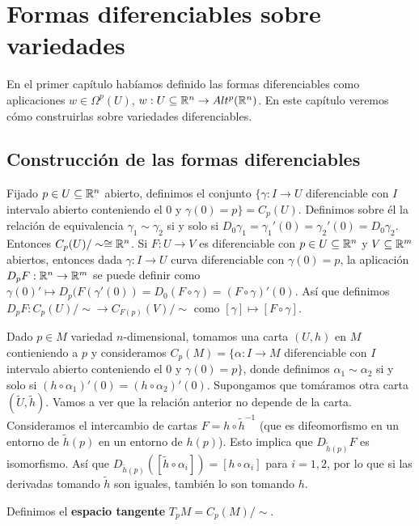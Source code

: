 \documentclass[CV.tex]{subfiles}
\begin{document}

\chapter{Formas diferenciables sobre variedades}

En el primer capítulo habíamos definido las formas diferenciables como aplicaciones $w\in\Omega^p(U)$, $w:U\subseteq\mathbb{R}^n\to Alt^p(\mathbb{R}^n)$. En este capítulo veremos cómo construirlas sobre variedades diferenciables.

\section{Construcción de las formas diferenciables}

Fijado $p\in U\subseteq\mathbb{R}^n$ abierto, definimos el conjunto $\{\gamma:I\to U$ diferenciable con $I$ intervalo abierto conteniendo el 0 y $\gamma(0)=p\}=C_p(U)$. Definimos sobre él la relación de equivalencia $\gamma_1\sim\gamma_2$ si y solo si $D_0\gamma_1=\gamma_1'(0)=\gamma_2'(0)=D_0\gamma_2$. Entonces $C_p(U)/\sim\cong\mathbb{R}^n$. Si $F:U\to V$ es diferenciable con $p\in U\subseteq\mathbb{R}^n$ y $V\subseteq\mathbb{R}^m$ abiertos, entonces dada $\gamma:I\to U$ curva diferenciable con $\gamma(0)=p$, la aplicación $D_pF:\mathbb{R}^n\to \mathbb{R}^m$ se puede definir como $\gamma(0)'\mapsto D_p(F(\gamma'(0))=D_0(F\circ\gamma)=(F\circ \gamma)'(0)$.  Así que definimos $D_pF:C_p(U)/\sim\to C_{F(p)}(V)/\sim$ como $[\gamma]\mapsto[F\circ\gamma]$.

Dado $p\in M$ variedad $n$-dimensional, tomamos una carta $(U,h)$ en $M$ contieniendo a $p$ y consideramos $C_p(M)=\{\alpha:I\to M$ diferenciable con $I$ intervalo abierto conteniendo el 0 y $\gamma(0)=p\}$, donde definimos $\alpha_1\sim\alpha_2$ si y solo si $(h\circ\alpha_1)'(0)=(h\circ\alpha_2)'(0)$. Supongamos que tomáramos otra carta $(\widetilde{U},\tilde{h})$. Vamos a ver que la relación anterior no depende de la carta. Consideramos el intercambio de cartas $F=h\circ\tilde{h}^{-1}$ (que es difeomorfismo en un entorno de $\tilde{h}(p)$ en un entorno de $h(p)$). Esto implica que $D_{\tilde{h}(p)}F$ es isomorfismo. Así que $D_{\tilde{h}(p)}([\tilde{h}\circ\alpha_i])=[h\circ \alpha_i]$ para $i=1,2$, por lo que si las derivadas tomando $\tilde{h}$ son iguales, también lo son tomando $h$.

\begin{defi}
Definimos el \textbf{espacio tangente} $T_pM=C_p(M)/\sim$.
\end{defi}
\end{document}
